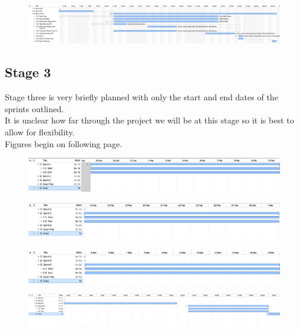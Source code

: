 \documentclass[11pt, a4paper]{report}
\begin{document}
\begin{figure}
\centering
\includegraphics[scale=0.3]{Figures/Plan2-3.png}
\end{figure}


\pagebreak
\subsection{Stage 3}
Stage three is very briefly planned with only the start and end dates of the sprints outlined.\\ 
It is unclear how far through the project we will be at this stage so it is best to allow for flexibility. \\

Figures begin on following page.

\begin{figure}
\centering
\includegraphics[scale=0.45]{Figures/Plan3-4.png}
\end{figure}

\begin{figure}
\centering
\includegraphics[scale=0.45]{Figures/Plan3-5.png}
\end{figure}

\begin{figure}
\centering
\includegraphics[scale=0.45]{Figures/Plan3-6.png}
\end{figure}

\begin{figure}
\centering
\includegraphics[scale=0.3]{Figures/Plan3-7.png}
\end{figure}
\end{document}
